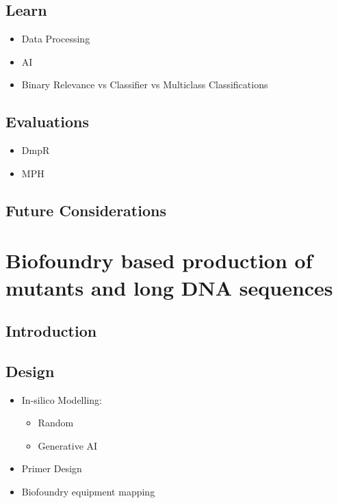 \documentclass[
  letterpaper,
]{book}
\begin{document}
\section{Learn}\label{learn}

\begin{itemize}
\item
  Data Processing
\item
  AI
\item
  Binary Relevance vs Classifier vs Multiclass Classifications
\end{itemize}

\section{Evaluations}\label{evaluations}

\begin{itemize}
\item
  DmpR
\item
  MPH
\end{itemize}

\section{Future Considerations}\label{future-considerations}


\chapter{Biofoundry based production of mutants and long DNA
sequences}\label{biofoundry-based-production-of-mutants-and-long-dna-sequences}

\section{Introduction}\label{introduction-3}

\section{Design}\label{design-1}

\begin{itemize}
\item
  In-silico Modelling:

  \begin{itemize}
  \item
    Random
  \item
    Generative AI
  \end{itemize}
\item
  Primer Design
\item
  Biofoundry equipment mapping
\end{itemize}
\end{document}
